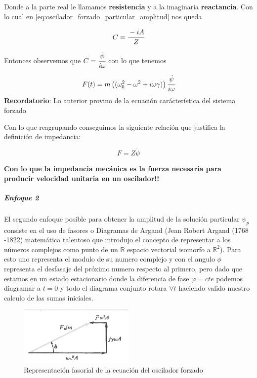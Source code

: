 \documentclass[a4paper,spanish]{article}
\def\R {\mathbb{R}}
\numberwithin{equation}{section}
\begin{document}
Donde a la parte real le llamamos \textbf{resistencia} y a la imaginaria \textbf{reactancia}. Con lo cual en \ref{eq:oscilador_forzado_particular_amplitud} nos queda

\[C=\cfrac{-iA}{Z}\]

Entonces observemos que $C=\cfrac{\dot{\psi}}{i\omega}$ con lo que tenemos

\[F(t)= m\left((\omega_0^2 - \omega^2 + i \omega \gamma)\right)\cfrac{\dot{\psi}}{i\omega}\]
\textbf{Recordatorio}: Lo anterior provino de la ecuaci\'on car\'acter\'istica del sistema forzado

Con lo que reagrupando conseguimos la siguiente relaci\'on que justifica la definici\'on de impedancia:

\begin{equation}
F=Z\dot{\psi}
\end{equation}

\textbf{Con lo que la impedancia mec\'anica es la fuerza necesaria para producir velocidad unitaria en un oscilador!!}

\subparagraph*{Enfoque 2}

El segundo enfoque posible para obtener la amplitud de la soluci\'on particular $\psi_p$ consiste en el uso de fasores o Diagramas de Argand (Jean Robert Argand (1768 -1822) matem\'atica talentoso que introdujo el concepto de representar a los n\'umeros complejos como punto de un $\R$ espacio vectorial isomorfo a $\R^2$). Para esto uno representa el modulo de su numero complejo y con el angulo $\phi$ representa el desfasaje del pr\'oximo numero respecto al primero, pero dado que estamos en un estado estacionario donde la diferencia de fase $\varphi=cte$ podemos diagramar a $t=0$ y todo el diagrama conjunto rotara $\forall t$ haciendo valido nuestro calculo de las sumas iniciales.

\begin{figure}[H]
  \centering
  \includegraphics[width=0.5\textwidth]{Imagenes/fasores.png}
  \caption{Representación fasorial de la ecuación del oscilador forzado}
  \label{fig:oscilador_forzado_fasores}
\end{figure}
\end{document}
